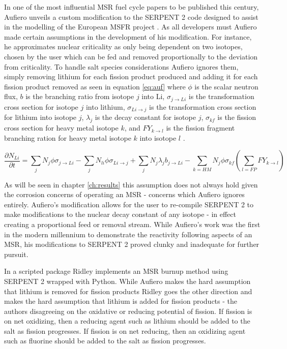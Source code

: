 In one of the most influential MSR fuel cycle papers to be published this
century, Aufiero unveils a custom modification to the SERPENT 2 code designed to
assist in the modelling of the European MSFR project \cite{Aufiero}. As all
developers must Aufiero made certain assumptions in the development of his
modification. For instance, he
 approximates nuclear criticality as only being dependent 
on two isotopes, chosen by the user which can be fed and removed proportionally
to the deviation from criticality. To handle salt species considerations Aufiero
ignores them, simply removing lithium for each fission product produced and
adding it for each fission product removed as seen in equation \ref{eq:auf} 
where $\phi$ is the scalar neutron flux, $b$ is the branching ratio
from isotope $j$ into Li, $\sigma_{j \rightarrow Li}$ is the transformation
cross section for isotope $j$ into lithium, $\sigma_{Li \rightarrow j}$ is the
transformation cross section for lithium into isotope $j$, $\lambda_{j}$ is
the decay constant for isotope $j$, $\sigma_{kf}$ is the fission cross section
for heavy metal isotope $k$, and $FY_{k \rightarrow l}$ is the fission
fragment branching ration for heavy metal isotope $k$ into isotope $l$ \cite{Aufiero}. 

\begin{equation} \label{eq:auf}
\frac{\partial N_{Li}}{\partial t} = \sum_{j} N_{j} \phi \sigma_{j \rightarrow
    Li} - \sum_{j} N_{li} \phi \sigma_{Li \rightarrow j} + \sum_{j} N_{j}
    \lambda_{j} b_{j \rightarrow Li} - \sum_{k = HM} N_{j} \phi \sigma_{kf}
    \left ( \sum_{l=FP}FY_{k \rightarrow l} \right )
\end{equation}

As will be seen in chapter \ref{ch:results} this assumption does not always hold
given the corrosion concerns of operating an MSR - concerns which Aufiero ignores
entirely. Aufiero's modification allows for the user to re-compile SERPENT 2 to
make modifications to the nuclear decay constant of any isotope - in effect 
creating a proportional feed or removal stream. While Aufiero's work was the
first in the modern millennium to demonstrate the reactivity following aspects
of an MSR, his modifications to SERPENT 2 proved clunky and inadequate for
further pursuit.

In a scripted package Ridley implements an MSR burnup method using SERPENT 2
wrapped with Python. While Aufiero makes the hard assumption that lithium is
removed for fission products Ridley goes the other direction and makes the
hard assumption that lithium is added for fission products - the authors
disagreeing on the oxidative or reducing potential of fission. If fission is on
net oxidizing, then a reducing agent such as lithium should be added to the salt
as fission progresses. If fission is on net reducing, then an oxidizing agent
such as fluorine should be added to the salt as fission progresses. 

